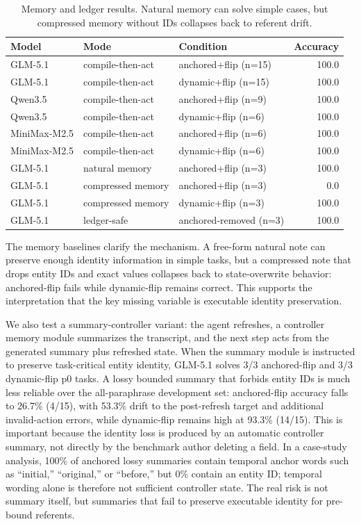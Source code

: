 \documentclass[11pt]{article}
\begin{document}
\begin{table}[h]
\centering
\begin{tabular}{lllr}
\toprule
Model & Mode & Condition & Accuracy \\
\midrule
GLM-5.1 & compile-then-act & anchored+flip (n=15) & 100.0 \\
GLM-5.1 & compile-then-act & dynamic+flip (n=15) & 100.0 \\
Qwen3.5 & compile-then-act & anchored+flip (n=9) & 100.0 \\
Qwen3.5 & compile-then-act & dynamic+flip (n=6) & 100.0 \\
MiniMax-M2.5 & compile-then-act & anchored+flip (n=6) & 100.0 \\
MiniMax-M2.5 & compile-then-act & dynamic+flip (n=6) & 100.0 \\
GLM-5.1 & natural memory & anchored+flip (n=3) & 100.0 \\
GLM-5.1 & compressed memory & anchored+flip (n=3) & 0.0 \\
GLM-5.1 & compressed memory & dynamic+flip (n=3) & 100.0 \\
GLM-5.1 & ledger-safe & anchored-removed (n=3) & 100.0 \\
\bottomrule
\end{tabular}
\caption{Memory and ledger results. Natural memory can solve simple cases, but compressed memory without IDs collapses back to referent drift.}
\end{table}

The memory baselines clarify the mechanism. A free-form natural note can preserve enough identity information in simple tasks, but a compressed note that drops entity IDs and exact values collapses back to state-overwrite behavior: anchored-flip fails while dynamic-flip remains correct. This supports the interpretation that the key missing variable is executable identity preservation.

We also test a summary-controller variant: the agent refreshes, a controller memory module summarizes the transcript, and the next step acts from the generated summary plus refreshed state. When the summary module is instructed to preserve task-critical entity identity, GLM-5.1 solves 3/3 anchored-flip and 3/3 dynamic-flip p0 tasks. A lossy bounded summary that forbids entity IDs is much less reliable over the all-paraphrase development set: anchored-flip accuracy falls to 26.7\% (4/15), with 53.3\% drift to the post-refresh target and additional invalid-action errors, while dynamic-flip remains high at 93.3\% (14/15). This is important because the identity loss is produced by an automatic controller summary, not directly by the benchmark author deleting a field. In a case-study analysis, 100\% of anchored lossy summaries contain temporal anchor words such as ``initial,'' ``original,'' or ``before,'' but 0\% contain an entity ID; temporal wording alone is therefore not sufficient controller state. The real risk is not summary itself, but summaries that fail to preserve executable identity for pre-bound referents.
\end{document}
